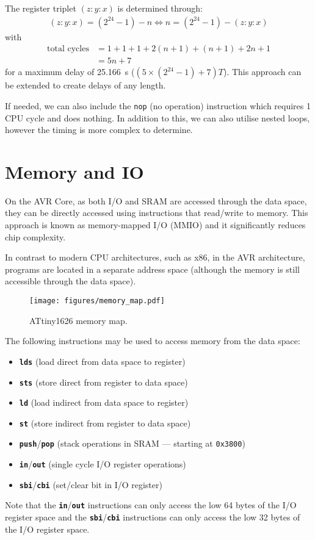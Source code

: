 \documentclass{report}
\newcommand{\keywordinline}[1]{\textcolor[rgb]{0.00,0.50,0.00}{\textbf{\texttt{#1}}}}
\begin{document}
The register triplet \(\left( z:y:x \right)\) is determined through:
\begin{align*}
    \left( z:y:x \right) = \left( 2^{24} - 1 \right) - n \iff n = \left( 2^{24} - 1 \right) - \left( z:y:x \right)
\end{align*}
with
\begin{align*}
    \text{total cycles} & = 1 + 1 + 1 + 2 \left( n + 1 \right) + \left( n + 1 \right) + 2 n + 1 \\
                        & = 5n + 7
\end{align*}
for a maximum delay of \qty{25.166}{s} (\(\left(5 \times \left( 2^{24} - 1 \right) + 7 \right) T\)).
This approach can be extended to create delays of any length.

If needed, we can also include the \texttt{nop} (no
operation) instruction which requires 1 CPU cycle and does nothing. In
addition to this, we can also utilise nested loops, however the timing
is more complex to determine.
\section{Memory and IO}
On the AVR Core, as both I/O and SRAM are accessed through the data
space, they can be directly accessed using instructions that read/write
to memory. This approach is known as memory-mapped I/O (MMIO) and it
significantly reduces chip complexity.

In contrast to modern CPU architectures, such as x86, in the AVR
architecture, programs are located in a separate address space
(although the memory is still accessible through the data space).
\begin{figure}[H]
    \centering
    \texttt{[image: figures/memory\_map.pdf]}
    \caption{ATtiny1626 memory map.} %
\end{figure}
The following instructions may be used to access memory from the data space:
\begin{itemize}
    \item \keywordinline{lds} (load direct from data space to register)
    \item \keywordinline{sts} (store direct from register to data space)
    \item \keywordinline{ld} (load indirect from data space to register)
    \item \keywordinline{st} (store indirect from register to data space)
    \item \keywordinline{push}/\keywordinline{pop} (stack operations in SRAM --- starting at \texttt{0x3800}) %
    \item \keywordinline{in}/\keywordinline{out} (single cycle I/O register operations)
    \item \keywordinline{sbi}/\keywordinline{cbi} (set/clear bit in I/O register)
\end{itemize}
Note that the \keywordinline{in}/\keywordinline{out} instructions can
only access the low 64 bytes of the I/O register space and the \keywordinline{sbi}/\keywordinline{cbi}
instructions can only access the low 32 bytes of the I/O register space.
\end{document}
